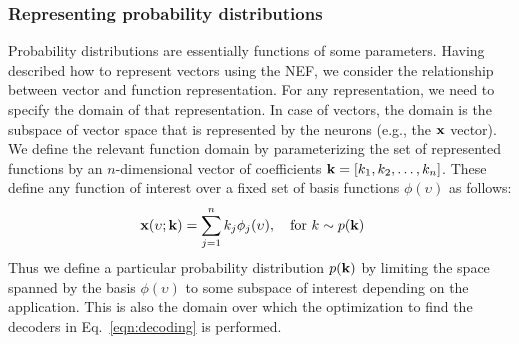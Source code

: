 \documentclass[10pt,letterpaper]{article}
\renewcommand{\vec}[1]{{\bf {#1}}}
\begin{document}
\subsubsection{Representing probability distributions}
Probability distributions are essentially functions of some parameters. Having described how to represent vectors using the NEF, we consider the relationship between vector and function representation. For any representation, we need to specify the domain of that representation. In case of vectors, the domain is the subspace of vector space that is represented by the neurons (e.g., the $\vec{x}$ vector). We define the relevant function domain by parameterizing the set of represented functions by an $n$-dimensional vector of coefficients $\vec{k} = \left[ k_1, k_2, \ldots, k_n \right]$. These define any function of interest over a fixed set of basis functions $\phi(\upsilon)$ as follows:
\begin{equation}
\label{eqn:function}
\begin{aligned} 
\vec{x}(\upsilon; \vec{k}) = \sum_{j=1}^n k_j \phi_j(\upsilon)  &, \quad \text{for $k \sim p(\vec{k})$} 
\end{aligned}
\end{equation}
Thus we define a particular probability distribution $p(\vec{k})$ by limiting the space spanned by the basis $\phi(\upsilon)$ to some subspace of interest depending on the application.
This is also the domain over which the optimization to find the decoders in Eq.~\ref{eqn:decoding} is performed. 
 
\end{document}
